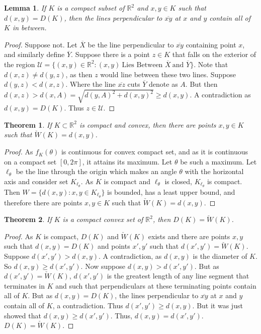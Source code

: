 \documentclass[crop=false,class=book]{standalone}
\theoremstyle{mystyle}
\newtheorem{theorem}{Theorem}[section]
\newtheorem{lemma}{Lemma}[section]
\begin{document}
\begin{lemma}
If $K$ is a compact subset of $\mathbb{R}^2$ and $x,y\in K$ such that $d(x,y)=D(K)$, then the lines perpendicular to $\overline{xy}$ at $x$ and $y$ contain all of $K$ in between.
\end{lemma}
\begin{proof}
Suppose not. Let $\overline{X}$ be the line perpendicular to $\overline{xy}$ containing point $x$, and similarly define $\overline{Y}$. Suppose there is a point $z\in K$ that falls on the exterior of the region $\mathcal{U} = \{(x,y)\in \mathbb{R}^2: (x,y)\ \textrm{Lies Between } \overline{X}\ \textrm{and } \overline{Y}\}$. Note that $d(x,z)\ne d(y,z)$, as then $z$ would line between these two lines. Suppose $d(y,z)<d(x,z)$. Where the line $\overline{xz}$ cuts $\overline{Y}$ denote as $A$. But then $d(x,z) > d(x,A) = \sqrt{d(y,A)^2+d(x,y)^2}\geq d(x,y)$. A contradiction as $d(x,y) = D(K)$. Thus $z\in \mathcal{U}$.
\end{proof}
\begin{theorem}
If $K\subset \mathbb{R}^2$ is compact and convex, then there are points $x,y\in K$ such that $\check{W}(K)=d(x,y)$.
\end{theorem}
\begin{proof}
As $f_K(\theta)$ is continuous for convex compact set, and as it is continuous on a compact set $[0,2\pi]$, it attains its maximum. Let $\theta$ be such a maximum. Let $\ell_{\theta}$ be the line through the origin which makes an angle $\theta$ with the horizontal axis and consider set $K_{\ell_{\theta}}$. As $K$ is compact and $\ell_{\theta}$ is closed, $K_{\ell_{\theta}}$ is compact. Then $W=\{d(x,y):x,y\in K_{\ell_{\theta}}\}$ is bounded, has a least upper bound, and therefore there are points $x,y \in K$ such that $\check{W}(K)=d(x,y)$.
\end{proof}
\begin{theorem}
If $K$ is a compact convex set of $\mathbb{R}^2$, then $D(K) = \check{W}(K)$.
\end{theorem}
\begin{proof}
As $K$ is compact, $D(K)$ and $\check{W}(K)$ exists and there are points $x,y$ such that $d(x,y) = D(K)$ and points $x',y'$ such that $d(x',y') = \check{W}(K)$. Suppose $d(x',y')> d(x,y)$. A contradiction, as $d(x,y)$ is the diameter of $K$. So $d(x,y) \geq d(x',y')$. Now suppose $d(x,y)>d(x',y')$. But as $d(x',y')= \check{W}(K)$, $d(x',y')$ is the greatest length of any line segment that terminates in $K$ and such that perpendiculars at these terminating points contain all of $K$. But as $d(x,y)=D(K)$, the lines perpendicular to $\overline{xy}$ at $x$ and $y$ contain all of $K$, a contradiction. Thus $d(x',y') \geq d(x,y)$. But it was just showed that $d(x,y)\geq d(x',y')$. Thus, $d(x,y) = d(x',y')$. $D(K) = \check{W}(K)$.
\end{proof}
\end{document}
